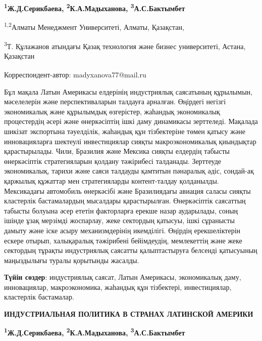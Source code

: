 
\begin{articleheader}

{\bfseries
\textsuperscript{1}Ж.Д.Серикбаева,
\textsuperscript{2}К.А.Мадыханова\textsuperscript{\envelope },
\textsuperscript{3}А.С.Бактымбет
}
\end{articleheader}

\begin{affiliation}
\textsuperscript{1,2}Алматы Менеджмент Университеті, Алматы, Қазақстан,

\textsuperscript{3}Т. Құлажанов атындағы Қазақ технология және бизнес университеті, Астана, Қазақстан

\raggedright \textsuperscript{\envelope }Корреспондент-автор: madyxanova77@mail.ru
\end{affiliation}

Бұл мақала Латын Америкасы елдерінің индустриялық саясатының құрылымын,
мәселелерін және перспективаларын талдауға арналған. Өңірдегі негізгі
экономикалық және құрылымдық өзгерістер, жаһандық экономикалық
процестердің әсері және өнеркәсіптің ішкі даму динамикасы зерттеледі.
Мақалада шикізат экспортына тәуелділік, жаһандық құн тізбектеріне төмен
қатысу және инновацияларға шектеулі инвестициялар сияқты
макроэкономикалық қиындықтар қарастырылады. Чили, Бразилия және Мексика
сияқты елдердің табысты өнеркәсіптік стратегияларын қолдану тәжірибесі
талданады. Зерттеуде экономикалық, тарихи және саяси талдауды қамтитын
пәнаралық әдіс, сондай-ақ қаржылық құжаттар мен стратегияларды
контент-талдау қолданылды. Мексикадағы автомобиль өнеркәсібі және
Бразилиядағы авиация саласы сияқты кластерлік бастамалардың мысалдары
қарастырылған. Өнеркәсіптік саясаттың табысты болуына әсер ететін
факторларға ерекше назар аударылады, соның ішінде ұзақ мерзімді
жоспарлау, жеке сектордың қатысуы, ішкі сұранысты дамыту және іске асыру
механизмдерінің икемділігі. Өңірдің ерекшеліктерін ескере отырып,
халықаралық тәжірибені бейімдеудің, мемлекеттің және жеке сектордың
тұрақты индустриялық саясатты қалыптастыруға белсенді қатысуының
маңыздылығы туралы қорытынды жасалды.

{\bfseries Түйін сөздер}: индустриялық саясат, Латын Америкасы,
экономикалық даму, инновациялар, макроэкономика, жаһандық құн
тізбектері, инвестициялар, кластерлік бастамалар.

\begin{articleheader}
{\bfseries ИНДУСТРИАЛЬНАЯ ПОЛИТИКА В СТРАНАХ ЛАТИНСКОЙ АМЕРИКИ}

{\bfseries
\textsuperscript{1}Ж.Д.Серикбаева,
\textsuperscript{2}К.А.Мадыханова\textsuperscript{\envelope },
\textsuperscript{3}А.С.Бактымбет
}
\end{articleheader}

